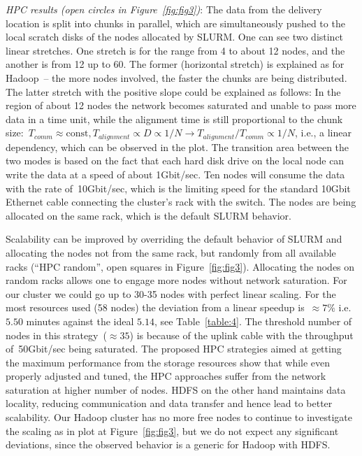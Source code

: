 \documentclass[10pt]{article}
\newcommand{\COMMENT}[1]{{\color{red} #1 }}
\begin{document}
\textit{HPC results (open circles in Figure~\ref{fig:fig3})}: The data from the delivery location is split into chunks in parallel, which are simultaneously pushed to the local scratch disks of the nodes allocated by SLURM\@. One can see two distinct linear stretches. One stretch is for the range from 4 to about 12 nodes, and the another is from 12 up to 60. The former (horizontal stretch) is explained as for Hadoop~-- the more nodes involved, the faster the chunks are being distributed. The latter stretch with the positive slope could be explained as follows: In the region of about 12 nodes the network becomes saturated
and unable to pass more data in a time unit, while the alignment time is still proportional to the chunk size:~$T_{comm}\approx\mbox{const}, T_{alignment}\propto D\propto 1/N \rightarrow T_{alignment}/T_{comm}\propto 1/N$, i.e., a linear dependency, which can be observed in the plot. 
The transition area between the two modes is based on the fact that each hard disk drive on the local node can write the data at a speed of about 1Gbit/sec. Ten nodes will consume the data with the rate of~10Gbit/sec, which is the limiting speed for the standard 10Gbit Ethernet cable connecting the cluster's rack with the switch. The nodes are being allocated on the same rack, which is the default SLURM behavior.

Scalability can be improved by overriding the default behavior of SLURM and allocating the nodes not from the same rack, but randomly from all available racks (``HPC random'', open squares in Figure~\ref{fig:fig3}). Allocating the nodes on random racks allows one to engage more nodes without network saturation. For our cluster we could go up to 30-35 nodes with perfect linear scaling. For the most resources used (58 nodes) the deviation from a linear speedup is~$\approx 7\%$ i.e. $5.50$ minutes against the ideal $5.14$, see Table~\ref{table:4}. The threshold number of nodes in this strategy~($\approx35$) is because of the uplink cable with the throughput of~50Gbit/sec being saturated. 
The proposed HPC strategies aimed at getting the maximum performance from the storage resources show that while even properly adjusted and tuned, the HPC approaches suffer from the network saturation at higher number of nodes.
HDFS on the other hand maintains data locality, reducing communication and data transfer and hence lead to better scalability.
Our Hadoop cluster has no more free nodes to continue to investigate the scaling as in plot at Figure~\ref{fig:fig3}, but we do not expect any significant deviations, since the observed behavior is a generic for Hadoop with HDFS\cite{lin2010, Hadoop:Guide}. 
\end{document}

